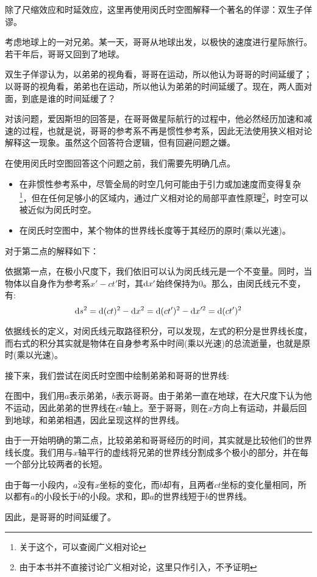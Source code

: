 除了尺缩效应和时延效应，这里再使用闵氏时空图解释一个著名的佯谬：双生子佯谬。

\begin{ex}[双生子佯谬]
	考虑地球上的一对兄弟。某一天，哥哥从地球出发，以极快的速度进行星际旅行。若干年后，哥哥又回到了地球。
	
	双生子佯谬认为，以弟弟的视角看，哥哥在运动，所以他认为哥哥的时间延缓了；以哥哥的视角看，弟弟也在运动，所以他认为弟弟的时间延缓了。现在，两人面对面，到底是谁的时间延缓了？
\end{ex}
\begin{so}
	对该问题，爱因斯坦的回答是，在哥哥做星际航行的过程中，他必然经历加速和减速的过程，也就是说，哥哥的参考系不再是惯性参考系，因此无法使用狭义相对论解释这一现象。虽然这个回答符合逻辑，但有回避问题之嫌。
	
	在使用闵氏时空图回答这个问题之前，我们需要先明确几点。
	\begin{itemize}
		\item 在非惯性参考系中，尽管全局的时空几何可能由于引力或加速度而变得复杂\footnote{关于这个，可以查阅广义相对论}，但在任何足够小的区域内，通过广义相对论的局部平直性原理\footnote{由于本书并不直接讨论广义相对论，这里只作引入，不予证明}，时空可以被近似为闵氏时空。
		\item 在闵氏时空图中，某个物体的世界线长度等于其经历的原时(乘以光速)。
	\end{itemize}
	
	对于第二点的解释如下：
	
	依据第一点，在极小尺度下，我们依旧可以认为闵氏线元是一个不变量。同时，当物体以自身作为参考系$x'-ct'$时，其$\dif x'$始终保持为$0$。那么，由闵氏线元不变，有:
	\begin{equation}
		\dif s^2=\dif(ct)^2-\dif x^2 = \dif (ct')^2-\dif x'^2 = \dif(ct')^2
	\end{equation}
	
	依据线长的定义，对闵氏线元取路径积分，可以发现，左式的积分是世界线长度，而右式的积分其实就是物体在自身参考系中时间(乘以光速)的总流逝量，也就是原时(乘以光速)。
	
	接下来，我们尝试在闵氏时空图中绘制弟弟和哥哥的世界线:
	
	在图中，我们用$a$表示弟弟，$b$表示哥哥。由于弟弟一直在地球，在大尺度下认为他不运动，因此弟弟的世界线在$ct$轴上。至于哥哥，则在$x$方向上有运动，并最后回到地球，和弟弟相遇，因此呈现这样的世界线。
	
	由于一开始明确的第二点，比较弟弟和哥哥经历的时间，其实就是比较他们的世界线长度。我们用与$x$轴平行的虚线将兄弟的世界线分割成多个极小的部分，并在每一个部分比较两者的长短。
	
	由于每一小段内，$a$没有$x$坐标的变化，而$b$却有，且两者$ct$坐标的变化量相同，所以都有$a$的小段长于$b$的小段。求和，即$a$的世界线短于$b$的世界线。
	
	因此，是哥哥的时间延缓了。
\end{so}
	